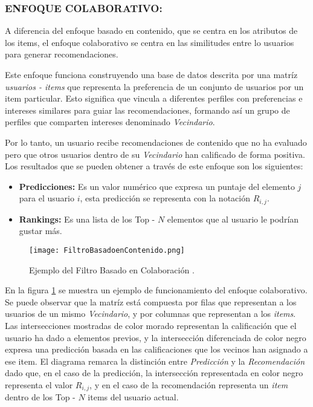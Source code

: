 \newpage
\thispagestyle{plain}
\vspace*{0.2cm}

\subsubsection[COLABORATIVO]{ENFOQUE COLABORATIVO:}

A diferencia del enfoque basado en contenido, que se centra en los atributos de los items, el enfoque colaborativo se centra en las similitudes entre lo usuarios para generar recomendaciones.

Este enfoque funciona construyendo una base de datos descrita por una matríz \textit{usuarios - items} que representa la preferencia de un conjunto de usuarios por un item particular. Esto significa que vincula a diferentes perfiles con preferencias e intereses similares para guiar las recomendaciones, formando así un grupo  de perfiles que comparten intereses denominado \textit{Vecindario}. 


Por lo tanto, un usuario recibe recomendaciones de contenido que no ha evaluado pero que otros usuarios dentro de su \textit{Vecindario} han calificado de forma positiva. Los resultados que se pueden obtener a través de este enfoque son los siguientes:

\begin{itemize}
    \item \textbf{Predicciones: } Es un valor numérico que expresa un puntaje del elemento $j$ para el usuario $i$, esta predicción se representa con la notación $R_{i,j}$.
    \item \textbf{Rankings: } Es una lista de los Top - $N$ elementos que al usuario le podrían gustar más.
\end{itemize}

\begin{figure}[h!]
    \centering
    \texttt{[image: FiltroBasadoenContenido.png]}
    \caption{Ejemplo del Filtro Basado en Colaboración \parencite{ISINKAYE2015261}.}
    \label{fig:FiltroColaborativo}
\end{figure}

\newpage
\thispagestyle{plain}
\vspace*{0.2cm}


En la figura \ref{fig:FiltroColaborativo} se muestra un ejemplo de funcionamiento del enfoque colaborativo. Se puede observar que la matríz está compuesta por filas que representan a los usuarios de un mismo \textit{Vecindario}, y por columnas que representan a los \textit{items}. Las intersecciones mostradas de color morado representan la calificación que el usuario ha dado a elementos previos, y la intersección diferenciada de color negro expresa una predicción basada en las calificaciones que los vecinos han asignado a ese item.
El diagrama remarca la distinción entre \textit{Predicción} y la \textit{Recomendación} dado que, en el caso de la predicción,  la intersección representada en color negro representa el valor $R_{i,j}$, y en el caso de la recomendación representa un \textit{item} dentro de los Top - $N$ items del usuario actual.

